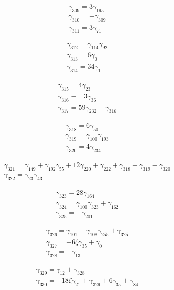 \[\begin{aligned}\gamma_{309}=3 \gamma_{195}\\ \gamma_{310}=- \gamma_{309}\\ \gamma_{311}=3 \gamma_{71}\end{aligned}\]

\[\begin{aligned}\gamma_{312}=\gamma_{114} \gamma_{92}\\ \gamma_{313}=6 \gamma_{0}\\ \gamma_{314}=34 \gamma_{1}\end{aligned}\]

\[\begin{aligned}\gamma_{315}=4 \gamma_{23}\\ \gamma_{316}=- 3 \gamma_{36}\\ \gamma_{317}=59 \gamma_{232} + \gamma_{316}\end{aligned}\]

\[\begin{aligned}\gamma_{318}=6 \gamma_{50}\\ \gamma_{319}=\gamma_{100} \gamma_{193}\\ \gamma_{320}=4 \gamma_{234}\end{aligned}\]

\[\begin{aligned}\gamma_{321}=\gamma_{149} + \gamma_{192} \gamma_{55} + 12 \gamma_{220} + \gamma_{222} + \gamma_{318} + \gamma_{319} - \gamma_{320}\\ \gamma_{322}=\gamma_{23} \gamma_{43}\end{aligned}\]

\[\begin{aligned}\gamma_{323}=28 \gamma_{164}\\ \gamma_{324}=\gamma_{100} \gamma_{323} + \gamma_{162}\\ \gamma_{325}=- \gamma_{201}\end{aligned}\]

\[\begin{aligned}\gamma_{326}=\gamma_{101} + \gamma_{108} \gamma_{255} + \gamma_{325}\\ \gamma_{327}=- 6 \zeta  \gamma_{35} + \gamma_{0}\\ \gamma_{328}=- \gamma_{13}\end{aligned}\]

\[\begin{aligned}\gamma_{329}=\gamma_{12} + \gamma_{328}\\ \gamma_{330}=- 18 \zeta  \gamma_{21} + \gamma_{329} + 6 \gamma_{35} + \gamma_{84}\end{aligned}\]

